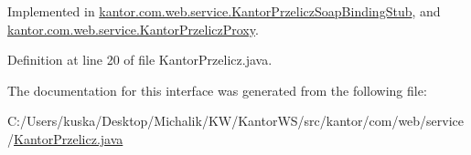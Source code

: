 Implemented in \hyperlink{classkantor_1_1com_1_1web_1_1service_1_1_kantor_przelicz_soap_binding_stub_a16867679e15bceab605c16b1b20ff89d}{kantor.\+com.\+web.\+service.\+Kantor\+Przelicz\+Soap\+Binding\+Stub}, and \hyperlink{classkantor_1_1com_1_1web_1_1service_1_1_kantor_przelicz_proxy_ad6db21ad3720cdfaf5d27db59412c630}{kantor.\+com.\+web.\+service.\+Kantor\+Przelicz\+Proxy}.



Definition at line 20 of file Kantor\+Przelicz.\+java.



The documentation for this interface was generated from the following file\+:\begin{DoxyCompactItemize}
\item 
C\+:/\+Users/kuska/\+Desktop/\+Michalik/\+K\+W/\+Kantor\+W\+S/src/kantor/com/web/service/\hyperlink{src_2kantor_2com_2web_2service_2_kantor_przelicz_8java}{Kantor\+Przelicz.\+java}\end{DoxyCompactItemize}
